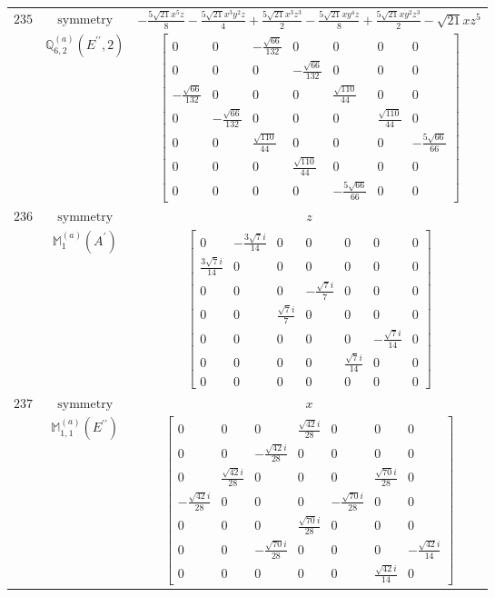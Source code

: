 \documentclass[fleqn,8pt,landscape]{jsarticle}
\begin{document}
\begin{longtable}{ccc}
$ 235 $ & $ \text{symmetry} $ & $ - \frac{5 \sqrt{21} x^{5} z}{8} - \frac{5 \sqrt{21} x^{3} y^{2} z}{4} + \frac{5 \sqrt{21} x^{3} z^{3}}{2} - \frac{5 \sqrt{21} x y^{4} z}{8} + \frac{5 \sqrt{21} x y^{2} z^{3}}{2} - \sqrt{21} x z^{5} $ \\
$  $ & $ \mathbb{Q}_{6,2}^{(a)}(E^{\prime\prime},2) $ & $ \begin{bmatrix} 0 & 0 & - \frac{\sqrt{66}}{132} & 0 & 0 & 0 & 0 \\ 0 & 0 & 0 & - \frac{\sqrt{66}}{132} & 0 & 0 & 0 \\ - \frac{\sqrt{66}}{132} & 0 & 0 & 0 & \frac{\sqrt{110}}{44} & 0 & 0 \\ 0 & - \frac{\sqrt{66}}{132} & 0 & 0 & 0 & \frac{\sqrt{110}}{44} & 0 \\ 0 & 0 & \frac{\sqrt{110}}{44} & 0 & 0 & 0 & - \frac{5 \sqrt{66}}{66} \\ 0 & 0 & 0 & \frac{\sqrt{110}}{44} & 0 & 0 & 0 \\ 0 & 0 & 0 & 0 & - \frac{5 \sqrt{66}}{66} & 0 & 0 \end{bmatrix} $ \\ \hline
$ 236 $ & $ \text{symmetry} $ & $ z $ \\
$  $ & $ \mathbb{M}_{1}^{(a)}(A^{\prime}) $ & $ \begin{bmatrix} 0 & - \frac{3 \sqrt{7} i}{14} & 0 & 0 & 0 & 0 & 0 \\ \frac{3 \sqrt{7} i}{14} & 0 & 0 & 0 & 0 & 0 & 0 \\ 0 & 0 & 0 & - \frac{\sqrt{7} i}{7} & 0 & 0 & 0 \\ 0 & 0 & \frac{\sqrt{7} i}{7} & 0 & 0 & 0 & 0 \\ 0 & 0 & 0 & 0 & 0 & - \frac{\sqrt{7} i}{14} & 0 \\ 0 & 0 & 0 & 0 & \frac{\sqrt{7} i}{14} & 0 & 0 \\ 0 & 0 & 0 & 0 & 0 & 0 & 0 \end{bmatrix} $ \\ \hline
$ 237 $ & $ \text{symmetry} $ & $ x $ \\
$  $ & $ \mathbb{M}_{1,1}^{(a)}(E^{\prime\prime}) $ & $ \begin{bmatrix} 0 & 0 & 0 & \frac{\sqrt{42} i}{28} & 0 & 0 & 0 \\ 0 & 0 & - \frac{\sqrt{42} i}{28} & 0 & 0 & 0 & 0 \\ 0 & \frac{\sqrt{42} i}{28} & 0 & 0 & 0 & \frac{\sqrt{70} i}{28} & 0 \\ - \frac{\sqrt{42} i}{28} & 0 & 0 & 0 & - \frac{\sqrt{70} i}{28} & 0 & 0 \\ 0 & 0 & 0 & \frac{\sqrt{70} i}{28} & 0 & 0 & 0 \\ 0 & 0 & - \frac{\sqrt{70} i}{28} & 0 & 0 & 0 & - \frac{\sqrt{42} i}{14} \\ 0 & 0 & 0 & 0 & 0 & \frac{\sqrt{42} i}{14} & 0 \end{bmatrix} $ \\ \hline

\end{longtable}
\end{document}
